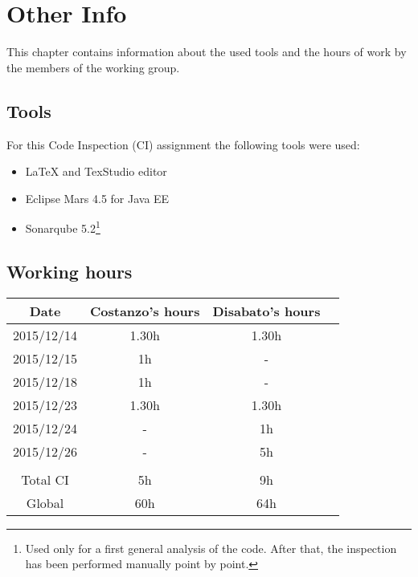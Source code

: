 \documentclass[\mainpath/main]{subfiles}
\begin{document}
\chapter{Other Info}
\label{OtherInfo}

\setmyfancystyle

This chapter contains information about the used tools and the hours of work by the members of the working group.

\section{Tools}
For this Code Inspection (CI) assignment the following tools were used:
\begin{itemize}
	\item \LaTeX{} and TexStudio editor
	\item Eclipse Mars 4.5 for Java EE
	\item Sonarqube 5.2\footnote{Used only for a first general analysis of the code. After that, the inspection has been performed manually point by point.}
\end{itemize}

\clearpage

\section{Working hours}
\begin{table}[h!]
	\centering
\begin{tabular}{cccc}
\hline
Date       & Costanzo's hours & Disabato's hours  & \\ \hline
2015/12/14 & 1.30h 			  & 1.30h 			  & \\ \hline
2015/12/15 & 1h 			  & - 				  & \\ \hline 
2015/12/18 & 1h               & -                & \\ \hline
2015/12/23 & 1.30h 			  & 1.30h 			  & \\ \hline     
2015/12/24 & - 			  & 1h		  & \\ \hline 
2015/12/26 & -		  & 5h 			  & \\ \hline
\\
Total CI   & 5h 		      & 9h 			  & \\ \hline
Global 	   & 60h 		  & 64h 			  & \\ \hline

\end{tabular}
\end{table}
\end{document}
